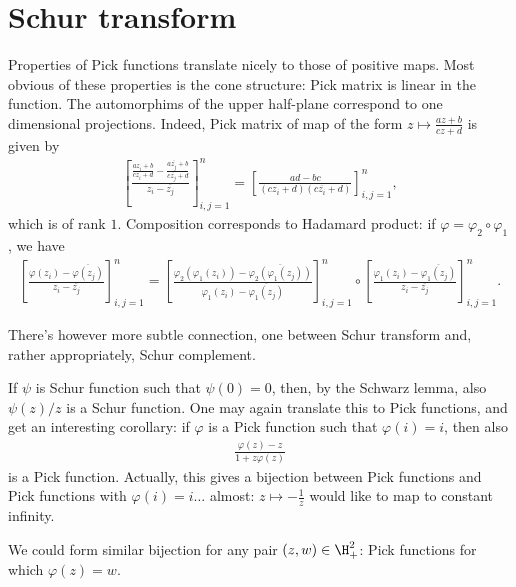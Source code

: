 \section{Schur transform}

Properties of Pick functions translate nicely to those of positive maps. Most obvious of these properties is the cone structure: Pick matrix is linear in the function. The automorphims of the upper half-plane correspond to one dimensional projections. Indeed, Pick matrix of map of the form $z \mapsto \frac{a z + b}{c z + d}$ is given by
\begin{align*}
	\left[\frac{\frac{a z_{i} + b}{c z_{i} + d} - \frac{a \overline{z_{j}} + b}{c \overline{z_{j}} + d}}{z_{i} - \overline{z_{j}}}\right]_{i, j = 1}^{n}
	=
	\left[\frac{a d - bc}{(c z_{i} + d) (c \overline{z_{i}} + d)}\right]_{i, j = 1}^{n},
\end{align*}
which is of rank $1$. Composition corresponds to Hadamard product: if $\varphi = \varphi_{2} \circ \varphi_{1}$, we have
\begin{align*}
	\left[\frac{\varphi(z_{i}) - \overline{\varphi(z_{j})}}{z_{i} - \overline{z_{j}}}\right]_{i, j = 1}^{n}
	=
	\left[\frac{\varphi_{2}(\varphi_{1}(z_{i})) - \overline{\varphi_{2}(\varphi_{1}(z_{j}))}}{\varphi_{1}(z_{i}) - \overline{\varphi_{1}(z_{j})}}\right]_{i, j = 1}^{n}
	\circ
	\left[\frac{\varphi_{1}(z_{i}) - \overline{\varphi_{1}(z_{j})}}{z_{i} - \overline{z_{j}}}\right]_{i, j = 1}^{n}.
\end{align*}

There's however more subtle connection, one between Schur transform and, rather appropriately, Schur complement.

If $\psi$ is Schur function such that $\psi(0) = 0$, then, by the Schwarz lemma, also $\psi(z)/z$ is a Schur function. One may again translate this to Pick functions, and get an interesting corollary: if $\varphi$ is a Pick function such that $\varphi(i) = i$, then also
\begin{align*}
	\frac{\varphi(z) - z}{1 + z \varphi(z)}
\end{align*}
is a Pick function. Actually, this gives a bijection between Pick functions and Pick functions with $\varphi(i) = i \ldots$ almost: $z \mapsto -\frac{1}{z}$ would like to map to constant infinity.

We could form similar bijection for any pair $(z, w) \in \H_{+}^{2}$: Pick functions for which $\varphi(z) = w$.


